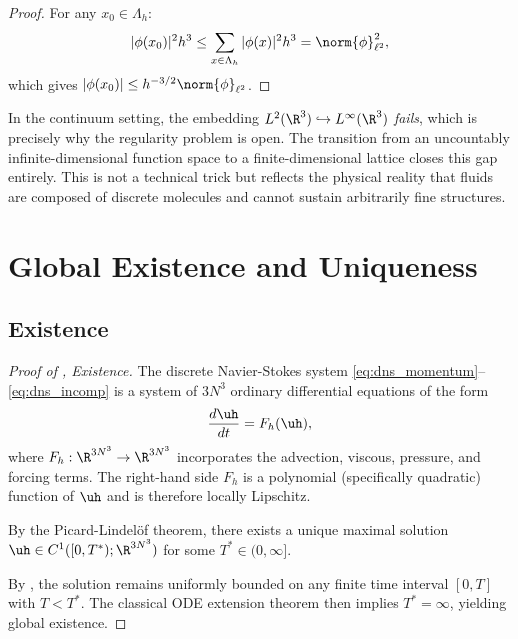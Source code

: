 \documentclass[12pt, a4paper]{article}
\theoremstyle{plain}
\theoremstyle{definition}
\begin{document}
\begin{proof}
  For any $x_0 \in \Lambda_h$:
  \begin{equation}
    |\phi(x_0)|^2 h^3 \leq \sum_{x \in \Lambda_h} |\phi(x)|^2 h^3 = \norm{\phi}_{\ell^2}^2,
  \end{equation}
  which gives $|\phi(x_0)| \leq h^{-3/2}\norm{\phi}_{\ell^2}$.
\end{proof}

\begin{remark}\label{rem:blowup}
  In the continuum setting, the embedding $L^2(\R^3) \hookrightarrow L^\infty(\R^3)$
  \emph{fails}, which is precisely why the regularity problem is open. The
  transition from an uncountably infinite-dimensional function space to a
  finite-dimensional lattice closes this gap entirely. This is not a technical
  trick but reflects the physical reality that fluids are composed of discrete
  molecules and cannot sustain arbitrarily fine structures.
\end{remark}

\section{Global Existence and Uniqueness}\label{sec:existence}

\subsection{Existence}

\begin{proof}[Proof of , Existence]
  The discrete Navier-Stokes system \eqref{eq:dns_momentum}--\eqref{eq:dns_incomp}
  is a system of $3N^3$ ordinary differential equations of the form
  \begin{equation}
    \frac{d\uh}{dt} = F_h(\uh),
  \end{equation}
  where $F_h: \R^{3N^3} \to \R^{3N^3}$ incorporates the advection, viscous,
  pressure, and forcing terms. The right-hand side $F_h$ is a polynomial
  (specifically quadratic) function of $\uh$ and is therefore locally Lipschitz.

  By the Picard-Lindel\"of theorem, there exists a unique maximal solution
  $\uh \in C^1([0, T^*); \R^{3N^3})$ for some $T^* \in (0, \infty]$.

  By , the solution remains uniformly bounded on any
  finite time interval $[0,T]$ with $T < T^*$. The classical ODE extension
  theorem then implies $T^* = \infty$, yielding global existence.
\end{proof}
\end{document}
